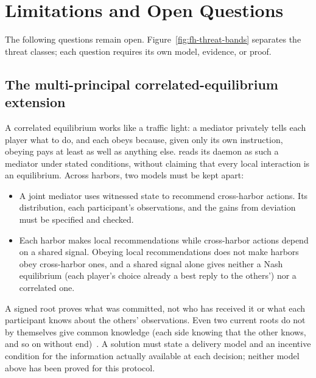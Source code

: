 \documentclass[11pt,a4paper]{article}
\theoremstyle{definition}
\theoremstyle{remark}
\begin{document}


\section{Limitations and Open Questions}\label{sec:fh-limitations}

The following questions remain open. Figure~\ref{fig:fh-threat-bands} separates the threat classes; each question requires its own model, evidence, or proof.

\subsection{The multi-principal correlated-equilibrium extension}\label{sec:fh-lim-correlated}

A correlated equilibrium works like a traffic light: a mediator privately tells each player what to do, and each obeys because, given only its own instruction, obeying pays at least as well as anything else.  reads its daemon as such a mediator under stated conditions, without claiming that every local interaction is an equilibrium. Across harbors, two models must be kept apart:

\begin{itemize}[nosep]
\item A joint mediator uses witnessed state to recommend cross-harbor actions. Its distribution, each participant's observations, and the gains from deviation must be specified and checked.
\item Each harbor makes local recommendations while cross-harbor actions depend on a shared signal. Obeying local recommendations does not make harbors obey cross-harbor ones, and a shared signal alone gives neither a Nash equilibrium (each player's choice already a best reply to the others') nor a correlated one.
\end{itemize}

A signed root proves what was committed, not who has received it or what each participant knows about the others' observations. Even two current roots do not by themselves give common knowledge (each side knowing that the other knows, and so on without end)~. A solution must state a delivery model and an incentive condition for the information actually available at each decision; neither model above has been proved for this protocol.
\end{document}
